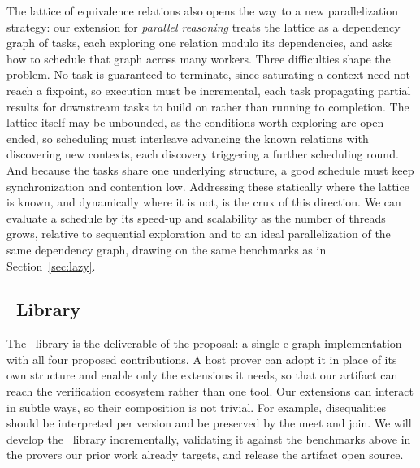 The lattice of equivalence relations also opens the way to a new parallelization
strategy: our extension for \textit{parallel reasoning} treats the lattice as a
dependency graph of tasks, each exploring one relation modulo its dependencies,
and asks how to schedule that graph across many workers. 
Three difficulties shape the problem.
No task is guaranteed to terminate, since saturating a context need not reach a
fixpoint, so execution must be incremental, each task propagating partial
results for downstream tasks to build on rather than running to completion. The
lattice itself may be unbounded, as the conditions worth exploring are
open-ended, so scheduling must interleave advancing the known relations with
discovering new contexts, each discovery triggering a further scheduling round.
And because
the tasks share one underlying structure, a good schedule must keep
synchronization and contention low. Addressing these statically where the
lattice is known, and dynamically where it is not, is the crux of this
direction. We can evaluate a schedule by its speed-up and scalability as the
number of threads grows, relative to sequential exploration and to an ideal
parallelization of the same dependency graph, drawing on the same benchmarks as
in Section~\ref{sec:lazy}.

\subsection{\system[\textbf]\ Library}

The \system\ library is the deliverable of the proposal: a single e-graph
implementation with all four proposed contributions. A host prover can adopt it in
place of its own structure and enable only the extensions it needs, so that our
artifact can reach the verification ecosystem rather than one tool. Our extensions can
interact in subtle ways, so their composition is not trivial. For example,
disequalities should be interpreted per version and be preserved by the
meet and join. We will develop the \system\ library incrementally, validating it against the
benchmarks above in the provers our prior work already targets, and release the
artifact open source.